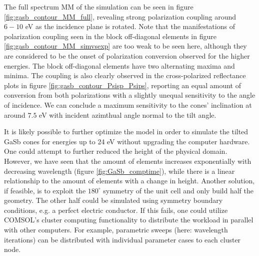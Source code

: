 The full spectrum MM of the simulation can be seen in figure \ref{fig:gasb_contour_MM_full}, revealing strong polarization coupling around $6-10$ eV as the incidence plane is rotated. Note that the manifestations of polarization coupling seen in the block off-diagonal elements in figure \ref{fig:gasb_contour_MM_simvsexp} are too weak to be seen here, although they are considered to be the onset of polarization conversion observed for the higher energies. The block off-diagonal elements have two alternating maxima and minima. The coupling is also clearly observed in the cross-polarized reflectance plots in figure \ref{fig:gasb_contour_Psisp_Psips}, reporting an equal amount of conversion from both polarizations with a slightly unequal sensitivity to the angle of incidence. We can conclude a maximum sensitivity to the cones' inclination at around $7.5$ eV with incident azimthual angle normal to the tilt angle.



It is likely possible to further optimize the model in order to simulate the tilted GaSb cones for energies up to 24 eV without upgrading the computer hardware. One could attempt to further reduced the height of the physical domain. However, we have seen that the amount of elements increases exponentially with decreasing wavelength (figure \ref{fig:GaSb_comptime}), while there is a linear relationship to the amount of elements with a change in height. Another solution, if feasible, is to exploit the $180^\circ$ symmetry of the unit cell and only build half the geometry. The other half could be simulated using symmetry boundary conditions, e.g. a perfect electric conductor. If this fails, one could utilize COMSOL's cluster computing functionality to distribute the workload in parallel with other computers. For example, parametric sweeps (here: wavelength iterations) can be distributed with individual parameter cases to each cluster node.



